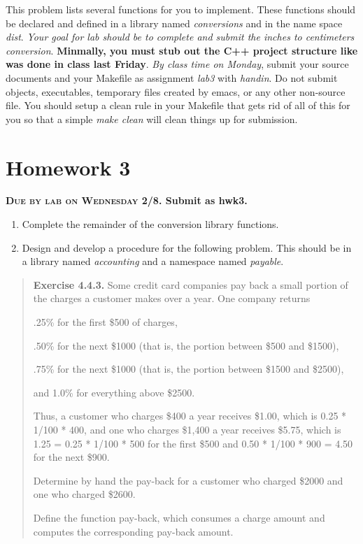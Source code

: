 \documentclass[]{tufte-handout}
\begin{document}
This problem lists several functions for you to implement. These functions should be declared and defined in a library named \textit{conversions} and in the name space \textit{dist}. \textit{Your goal for lab should be to complete and submit the inches to centimeters conversion}. \textbf{Minmally, you must stub out the C++ project structure like was done in class last Friday}. \textit{By class time on Monday}, submit your source documents and your Makefile as assignment \textit{lab3} with \textit{handin}.  Do not submit objects, executables, temporary files created by emacs, or any other non-source file. You should setup a clean rule in your Makefile that gets rid of all of this for you so that a simple \textit{make clean} will clean things up for submission.

\newpage

\section{Homework 3}

\begin{center}
\textbf{\textsc{Due by lab on Wednesday 2/8}. Submit as hwk3.}
\end{center}

\begin{enumerate}
\item Complete the remainder of the conversion library functions.
\item Design and develop a procedure for the following problem. This should be in a library named \textit{accounting} and a namespace named \textit{payable}.
\end{enumerate}

\begin{framed}
\begin{quote}
\textbf{Exercise 4.4.3.}   Some credit card companies pay back a small portion of the charges a customer makes over a year. One company returns

.25\% for the first \$500 of charges,

.50\% for the next \$1000 (that is, the portion between \$500 and \$1500),

.75\% for the next \$1000 (that is, the portion between \$1500 and \$2500),

and 1.0\% for everything above \$2500.

Thus, a customer who charges \$400 a year receives \$1.00, which is 0.25 * 1/100 * 400, and one who charges \$1,400 a year receives \$5.75, which is 1.25 = 0.25 * 1/100 * 500 for the first \$500 and 0.50 * 1/100 * 900 = 4.50 for the next \$900.

Determine by hand the pay-back for a customer who charged \$2000 and one who charged \$2600.

Define the function pay-back, which consumes a charge amount and computes the corresponding pay-back amount.
\end{quote}
\end{framed}
\end{document}
